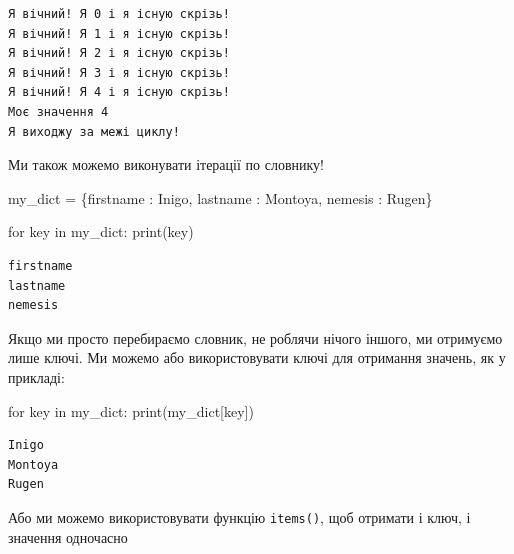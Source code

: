 \documentclass[
  letterpaper,
]{report}
\newenvironment{Shaded}{\begin{snugshade}}{\end{snugshade}}
\newcommand{\BuiltInTok}[1]{\textcolor[rgb]{0.00,0.23,0.31}{#1}}
\newcommand{\ControlFlowTok}[1]{\textcolor[rgb]{0.00,0.23,0.31}{#1}}
\newcommand{\KeywordTok}[1]{\textcolor[rgb]{0.00,0.23,0.31}{#1}}
\newcommand{\NormalTok}[1]{\textcolor[rgb]{0.00,0.23,0.31}{#1}}
\newcommand{\OperatorTok}[1]{\textcolor[rgb]{0.37,0.37,0.37}{#1}}
\newcommand{\StringTok}[1]{\textcolor[rgb]{0.13,0.47,0.30}{#1}}
\begin{document}
\begin{verbatim}
Я вічний! Я 0 і я існую скрізь!
Я вічний! Я 1 і я існую скрізь!
Я вічний! Я 2 і я існую скрізь!
Я вічний! Я 3 і я існую скрізь!
Я вічний! Я 4 і я існую скрізь!
Моє значення 4
Я виходжу за межі циклу!
\end{verbatim}

Ми також можемо виконувати ітерації по словнику!

\begin{Shaded}
\begin{Highlighting}[]
\NormalTok{my\_dict }\OperatorTok{=}\NormalTok{ \{}\StringTok{\textquotesingle{}firstname\textquotesingle{}}\NormalTok{ : }\StringTok{\textquotesingle{}Inigo\textquotesingle{}}\NormalTok{, }\StringTok{\textquotesingle{}lastname\textquotesingle{}}\NormalTok{ : }\StringTok{\textquotesingle{}Montoya\textquotesingle{}}\NormalTok{, }\StringTok{\textquotesingle{}nemesis\textquotesingle{}}\NormalTok{ : }\StringTok{\textquotesingle{}Rugen\textquotesingle{}}\NormalTok{\}}
\end{Highlighting}
\end{Shaded}

\begin{Shaded}
\begin{Highlighting}[]
\ControlFlowTok{for}\NormalTok{ key }\KeywordTok{in}\NormalTok{ my\_dict:}
    \BuiltInTok{print}\NormalTok{(key)}
\end{Highlighting}
\end{Shaded}

\begin{verbatim}
firstname
lastname
nemesis
\end{verbatim}

Якщо ми просто перебираємо словник, не роблячи нічого іншого, ми
отримуємо лише ключі. Ми можемо або використовувати ключі для отримання
значень, як у прикладі:

\begin{Shaded}
\begin{Highlighting}[]
\ControlFlowTok{for}\NormalTok{ key }\KeywordTok{in}\NormalTok{ my\_dict:}
    \BuiltInTok{print}\NormalTok{(my\_dict[key])}
\end{Highlighting}
\end{Shaded}

\begin{verbatim}
Inigo
Montoya
Rugen
\end{verbatim}

Або ми можемо використовувати функцію \texttt{items()}, щоб отримати і
ключ, і значення одночасно
\end{document}
